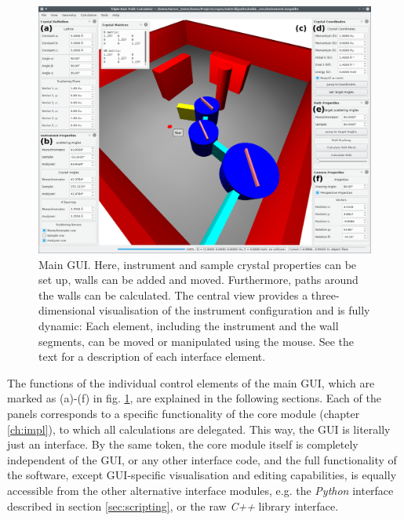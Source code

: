 \begin{figure}[htb]
		\begin{center}
			\includegraphics[width = 1 \textwidth]{figures/gui}
		\end{center}
	\caption[Main program GUI.]{Main GUI. 
		Here, instrument and sample crystal properties can be set up,
		walls can be added and moved. 
		Furthermore, paths around the walls can be calculated.
		The central view provides a three-dimensional visualisation of the instrument
		configuration and is fully dynamic: Each element, including the instrument
		and the wall segments, can be moved or manipulated using the mouse.
		See the text for a description of each interface element.
		\label{fig:gui}}
\end{figure}

The functions of the individual control elements of the main GUI, which are marked as (a)-(f)
in fig. \ref{fig:gui}, are explained in the following sections. Each of the panels corresponds to a specific
functionality of the core module (chapter \ref{ch:impl}), to which all calculations are delegated. 
This way, the GUI is literally just an interface.
By the same token, the core module itself is completely independent of the GUI, or any other
interface code, and the full functionality of the software, except GUI-specific visualisation and editing
capabilities, is equally accessible from the other alternative interface modules, e.g. the \textit{Python}
interface described in section \ref{sec:scripting}, or the raw \textit{C++} library interface.



